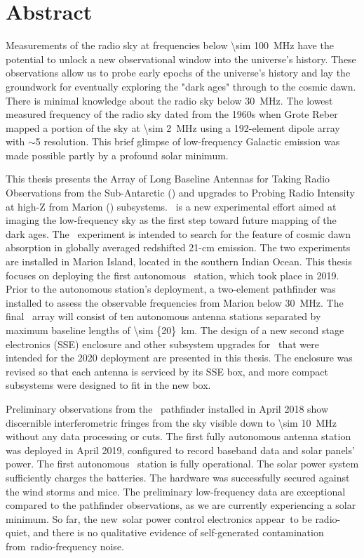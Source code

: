 \section*{Abstract}

Measurements of the radio sky at frequencies below \SI{\sim 100}{\mega \hertz} have the potential to unlock a new observational window into the universe's history. These observations allow us to probe early epochs of the universe's history and lay the groundwork for eventually exploring the "dark ages" through to the cosmic dawn. There is minimal knowledge about the radio sky below \SI{30}{\mega \hertz}. The lowest measured frequency of the radio sky dated from the 1960s when Grote Reber mapped a portion of the sky at \SI{\sim 2}{\mega \hertz} using a 192-element dipole array with $\sim$5 \degree resolution. This brief glimpse of low-frequency Galactic emission was made possible partly by a profound solar minimum.

This thesis presents the Array of Long Baseline Antennas for Taking Radio Observations from the Sub-Antarctic (\albatros) and upgrades to Probing Radio Intensity at high-Z from Marion (\prizm) subsystems. \albatros\ is a new experimental effort aimed at imaging the low-frequency sky as the first step toward future mapping of the dark ages. The \prizm\ experiment is intended to search for the feature of cosmic dawn absorption in globally averaged redshifted 21-cm emission. The two experiments are installed in Marion Island, located in the southern Indian Ocean.  This thesis focuses on deploying the first autonomous \albatros\ station, which took place in 2019. Prior to the autonomous station's deployment, a two-element pathfinder was installed to assess the observable frequencies from Marion below \SI{30}{\mega \hertz}. The final \albatros\ array will consist of ten autonomous antenna stations separated by maximum baseline lengths of \SI{\sim {20}}{km}. The design of a new second stage electronics (SSE) enclosure and other subsystem upgrades for \prizm\ that were intended for the 2020 deployment are presented in this thesis. The enclosure was revised so that each antenna is serviced by its SSE box, and more compact subsystems were designed to fit in the new box.

Preliminary observations from the \albatros\ pathfinder installed in April 2018 show discernible interferometric fringes from the sky visible down to \SI{\sim 10}{\mega \hertz} without any data processing or cuts. The first fully autonomous antenna station was deployed in April 2019, configured to record baseband data and solar panels' power. The first autonomous \albatros\ station is fully operational. The solar power system sufficiently charges the batteries. The hardware was successfully secured against the wind storms and mice. The preliminary low-frequency data are exceptional compared to the pathfinder observations, as we are currently experiencing a solar minimum. So far, the new solar power control electronics appear to be radio-quiet, and there is no qualitative evidence of self-generated contamination from radio-frequency noise.
